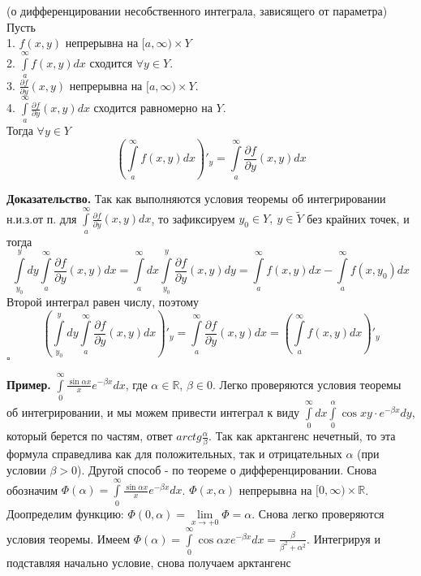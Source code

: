 \begin{theor}
    (о дифференцировании несобственного интеграла, зависящего от параметра)\\
    Пусть\\
    1. $f(x,y)$ непрерывна на  $[a,\infty)\times Y$\\
    2. $\int\limits_{a}^{\infty} f(x,y)dx$ сходится  $\forall y\in Y$.\\
3. $\frac{\partial f}{\partial y}(x,y)$ непрерывна на $[a,\infty)\times Y$.\\
4. $\int\limits_{a}^{\infty} \frac{\partial f}{\partial y}(x,y)dx$ сходится
равномерно на $Y$.\\
    Тогда $\forall y\in Y$ 
$$\left( \int\limits_{a}^{\infty}f(x,y) dx \right)'_y=\int\limits_{a}^{\infty}
 \frac{\partial f}{\partial y}(x,y)dx$$

\end{theor}
\textbf{Доказательство.} Так как выполняются условия теоремы об интегрировании
н.и.з.от п. для $\int\limits_{a}^{\infty}\frac{\partial f}{\partial y}(x,y)dx$,
то зафиксируем $y_0\in Y,~y\in \tilde Y$ без крайних точек, и тогда
$$\int\limits_{y_0}^{y}dy \int\limits_{a}^{\infty} 
\frac{\partial f}{\partial y}(x,y)dx=\int\limits_{a}^{\infty}dx
\int\limits_{y_0}^{y} \frac{\partial f}{\partial y}(x,y)dy=
\int\limits_{a}^{\infty}f(x,y)dx-\int\limits_{a}^{\infty}f(x,y_0)dx$$
Второй интеграл равен числу, поэтому
$$\left( \int\limits_{y_0}^{y} dy \int\limits_{a}^{\infty}
\frac{\partial f}{\partial y}(x,y) dx \right)'_y=
\int\limits_{a}^{\infty}\frac{\partial f}{\partial y}(x,y)dx 
=\left( \int\limits_{a}^{\infty} f(x,y)dx \right)'_y$$ $\square$ 

\textbf{Пример.} $\int\limits_{0}^{\infty} \frac{\sin\alpha x}{x}
e^{-\beta x}dx$, где $\alpha\in \mathbb{R}$, $\beta\in 0$. 
Легко проверяются условия теоремы об интегрировании, и мы можем 
привести интеграл к виду $\int\limits_{0}^{\infty}dx
\int\limits_{0}^{\alpha} \cos{xy}\cdot e^{-\beta x}dy$, который берется по
частям, ответ $arctg \frac{\alpha}{\beta}$. Так как арктангенс нечетный, 
то эта формула справедлива как для положительных, так и отрицательных
$\alpha$ (при условии $\beta>0$). Другой способ - по теореме о
дифференцировании. Снова обозначим $\Phi(\alpha)=
\int\limits_{0}^{\infty} \frac{\sin{\alpha x}}{x}e^{-\beta x}dx$. 
$\Phi(x,\alpha)$ непрерывна на $[0,\infty)\times \mathbb{R}$. Доопределим
функцию: $\Phi(0,\alpha)=\lim\limits_{x \to +0} \Phi=\alpha$. Снова легко
проверяются условия теоремы. Имеем $\Phi(\alpha)=
\int\limits_{0}^{\infty} \cos{\alpha x}e^{-\beta x}dx=\frac{\beta}{
    \beta^2+\alpha^2}$. Интегрируя и подставляя начально условие, снова 
    получаем арктангенс
